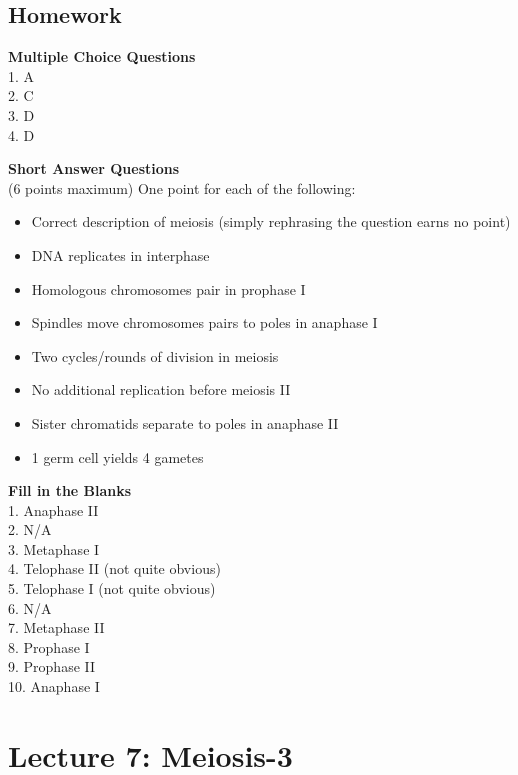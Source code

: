 \documentclass[
]{book}
\providecommand{\tightlist}{%
  \setlength{\itemsep}{0pt}\setlength{\parskip}{0pt}}
\begin{document}
\hypertarget{homework-2}{%
\subsection{Homework}\label{homework-2}}

\textbf{Multiple Choice Questions}\\
1. A\\
2. C\\
3. D\\
4. D

\textbf{Short Answer Questions}\\
(6 points maximum) One point for each of the following:

\begin{itemize}
\tightlist
\item
  Correct description of meiosis (simply rephrasing the question earns no point)\\
\item
  DNA replicates in interphase\\
\item
  Homologous chromosomes pair in prophase I\\
\item
  Spindles move chromosomes pairs to poles in anaphase I\\
\item
  Two cycles/rounds of division in meiosis\\
\item
  No additional replication before meiosis II\\
\item
  Sister chromatids separate to poles in anaphase II\\
\item
  1 germ cell yields 4 gametes
\end{itemize}

\textbf{Fill in the Blanks}\\
1. Anaphase II\\
2. N/A\\
3. Metaphase I\\
4. Telophase II (not quite obvious)\\
5. Telophase I (not quite obvious)\\
6. N/A\\
7. Metaphase II\\
8. Prophase I\\
9. Prophase II\\
10. Anaphase I

\hypertarget{lecture-7-meiosis-3}{%
\section{Lecture 7: Meiosis-3}\label{lecture-7-meiosis-3}}
\end{document}

